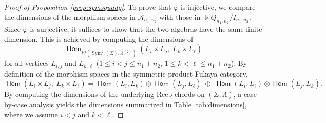 \documentclass[a4paper, reqno, 11pt]{amsart}
\theoremstyle{definition}
\newcommand{\opname}[1]{\operatorname{\mathsf{#1}}}
\newcommand{\Hom}{\opname{Hom}}
\begin{document}
\begin{proof}[Proof of Proposition \ref{prop:symsquadg}]
		To prove that $\widetilde \varphi$ is injective, we compare the dimensions of the morphism spaces in $\widetilde{\mathcal{A}}_{n_1,n_2}$ with those in $\Bbbk\widetilde Q_{n_1,n_2}/\widetilde I_{n_1,n_2}$. Since $\widetilde\varphi$ is surjective, it suffices to show that the two algebras have the same finite dimension. This is achieved by computing the dimensions of
		\[
		\Hom_{\mathcal{W}(\operatorname{Sym}^2(\Sigma),\Lambda^{(2)})}(L_i\times L_j,\; L_k\times L_\ell)
		\]
		for all vertices $L_{i,j}$ and $L_{k,\ell}$ ($1\le i<j\le n_1+n_2$, $1\le k<\ell\le n_1+n_2$). By definition of the morphism spaces in the symmetric‑product Fukaya category,
		\[
		\Hom(L_i\times L_j,\; L_k\times L_\ell)=\Hom(L_i,L_k)\otimes\Hom(L_j,L_\ell)\;\oplus\;\Hom(L_i,L_\ell)\otimes\Hom(L_j,L_k).
		\]
		By computing the dimensions of the underlying Reeb chords on $(\Sigma, \Lambda)$, a case-by-case analysis yields the dimensions summarized in Table \ref{tab:dimensions}, where we assume $i < j$ and $k < \ell$.
		

\end{proof}
\end{document}
